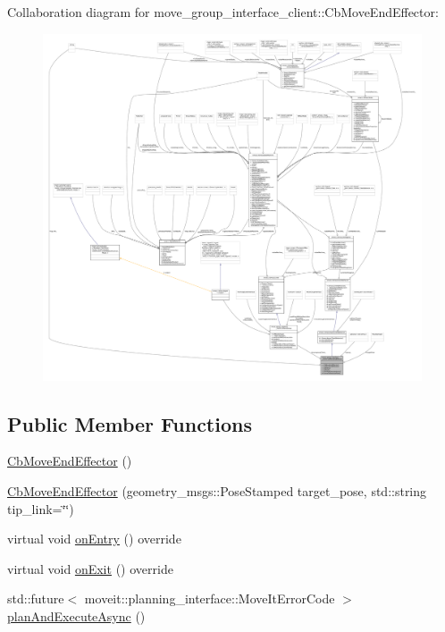 Collaboration diagram for move\+\_\+group\+\_\+interface\+\_\+client\+:\+:Cb\+Move\+End\+Effector\+:
\nopagebreak
\begin{figure}[H]
\begin{center}
\leavevmode
\includegraphics[width=350pt]{classmove__group__interface__client_1_1CbMoveEndEffector__coll__graph}
\end{center}
\end{figure}
\subsection*{Public Member Functions}
\begin{DoxyCompactItemize}
\item 
\hyperlink{classmove__group__interface__client_1_1CbMoveEndEffector_af099daf41522868d1ad8e9c9cf4f73e3}{Cb\+Move\+End\+Effector} ()
\item 
\hyperlink{classmove__group__interface__client_1_1CbMoveEndEffector_a2c04d1059de71a90b87cb23b8de2a45d}{Cb\+Move\+End\+Effector} (geometry\+\_\+msgs\+::\+Pose\+Stamped target\+\_\+pose, std\+::string tip\+\_\+link=\char`\"{}\char`\"{})
\item 
virtual void \hyperlink{classmove__group__interface__client_1_1CbMoveEndEffector_acd7f50c949fcf6e7c56b285439b0b1de}{on\+Entry} () override
\item 
virtual void \hyperlink{classmove__group__interface__client_1_1CbMoveEndEffector_a5dae0057f6f89fd99288e802cc37b07d}{on\+Exit} () override
\item 
std\+::future$<$ moveit\+::planning\+\_\+interface\+::\+Move\+It\+Error\+Code $>$ \hyperlink{classmove__group__interface__client_1_1CbMoveEndEffector_a1d01b53676a8066f726c59a96a9fe107}{plan\+And\+Execute\+Async} ()
\end{DoxyCompactItemize}
